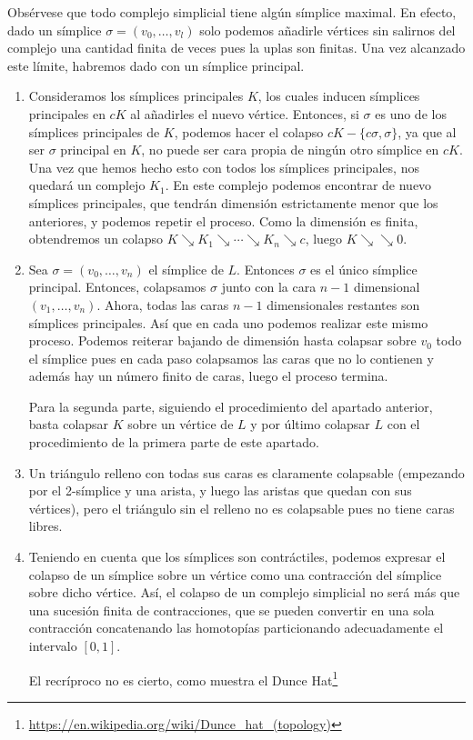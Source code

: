 \documentclass[twoside]{article}
\newcommand{\colapso}{{\searrow\!\!\!\!\searrow}}
\begin{document}
\begin{solucion}
Obsérvese que todo complejo simplicial tiene algún símplice maximal. En efecto, dado un símplice $\sigma=(v_0,\dots, v_l)$ solo podemos añadirle vértices sin salirnos del complejo una cantidad finita de veces pues la uplas son finitas. Una vez alcanzado este límite, habremos dado con un símplice principal.
\begin{enumerate}
\item Consideramos los símplices principales $K$, los cuales inducen símplices principales en $cK$ al añadirles el nuevo vértice. Entonces, si $\sigma$ es uno de los símplices principales de $K$, podemos hacer el colapso $cK-\{c\sigma,\sigma\}$, ya que al ser $\sigma$ principal en $K$, no puede ser cara propia de ningún otro símplice en $cK$. Una vez que hemos hecho esto con todos los símplices principales, nos quedará un complejo $K_1$. En este complejo podemos encontrar de nuevo símplices principales, que tendrán dimensión estrictamente menor que los anteriores, y podemos repetir el proceso. Como la dimensión es finita, obtendremos un colapso $K\searrow K_1\searrow\cdots\searrow K_n\searrow c$, luego $K\colapso 0$.

\item Sea $\sigma=(v_0,\dots, v_n)$ el símplice de $L$. Entonces $\sigma$ es el único símplice principal. Entonces, colapsamos $\sigma$ junto con la cara $n-1$ dimensional $(v_1,\dots, v_n)$. Ahora, todas las caras $n-1$ dimensionales restantes son símplices principales. Así que en cada uno podemos realizar este mismo proceso. Podemos reiterar bajando de dimensión hasta colapsar sobre $v_0$ todo el símplice pues en cada paso colapsamos las caras que no lo contienen y además hay un número finito de caras, luego el proceso termina.

Para la segunda parte, siguiendo el procedimiento del apartado anterior, basta colapsar $K$ sobre un vértice de $L$ y por último colapsar $L$ con el procedimiento de la primera parte de este apartado.
\item Un triángulo relleno con todas sus caras es claramente colapsable (empezando por el 2-símplice y una arista, y luego las aristas que quedan con sus vértices), pero el triángulo sin el relleno no es colapsable pues no tiene caras libres.

\item Teniendo en cuenta que los símplices son contráctiles, podemos expresar el colapso de un símplice sobre un vértice como una contracción del símplice sobre dicho vértice. Así, el colapso de un complejo simplicial no será más que una sucesión finita de contracciones, que se pueden convertir en una sola contracción concatenando las homotopías particionando adecuadamente el intervalo $[0,1]$.

El recríproco no es cierto, como muestra el Dunce Hat\footnote{\url{https://en.wikipedia.org/wiki/Dunce_hat_(topology)}}
\end{enumerate}
\end{solucion}
\end{document}
